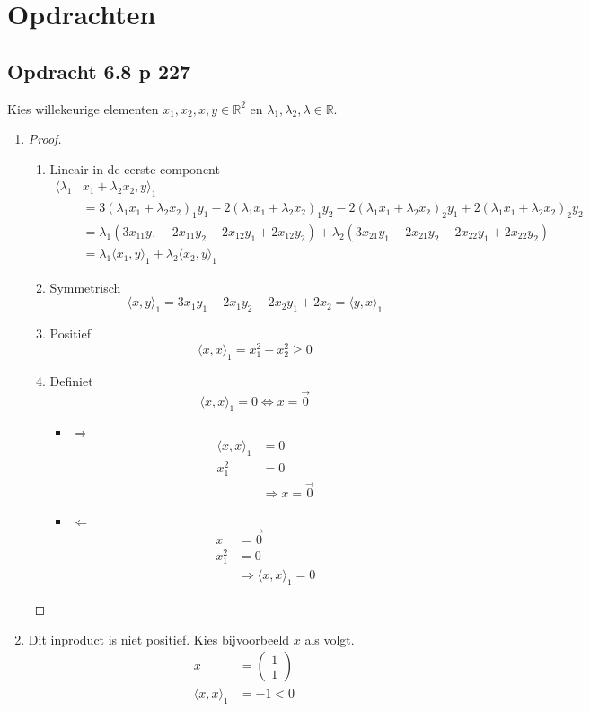 \documentclass[lineaire_algebra_oplossingen.tex]{subfiles}
\begin{document}
\section{Opdrachten}
\subsection{Opdracht 6.8 p 227}
\label{6.8}
Kies willekeurige elementen $x_1,x_2,x,y \in \mathbb{R}^{2}$ en $\lambda_1,\lambda_2,\lambda \in \mathbb{R}$.
\begin{enumerate}
\item
\begin{proof}
\begin{enumerate}
\item Lineair in de eerste component
\begin{align*}
\langle \lambda_1&x_1+ \lambda_2x_2,y \rangle_1 \\
&= 3(\lambda_1x_1 + \lambda_2x_2)_1y_1 - 2(\lambda_1x_1 + \lambda_2x_2)_1y_2-2(\lambda_1x_1 + \lambda_2x_2)_2y_1+2(\lambda_1x_1 + \lambda_2x_2)_2y_2 \\
&= \lambda_1(3x_{11}y_1-2x_{11}y_2-2x_{12}y_1+2x_{12}y_2) + \lambda_2(3x_{21}y_1-2x_{21}y_2-2x_{22}y_1+2x_{22}y_2) \\
&= \lambda_1\langle x_1,y \rangle_1 + \lambda_2\langle x_2,y \rangle_1
\end{align*}

\item Symmetrisch
\[
\langle x , y \rangle_1
=
3x_{1}y_1-2x_{1}y_2-2x_{2}y_1+2x_{2}
= \langle y , x \rangle_1
\]

\item Positief
\[
\langle x,x \rangle_1  = x_1^2 + x_2^2\ge 0
\]

\item Definiet
\[
\langle x,x \rangle_1 = 0 \Leftrightarrow x= \vec{0}
\]
\begin{itemize}
\item $\Rightarrow$
\begin{align*}
\langle x,x \rangle_1 &= 0 \\
x_1^2 &= 0 \\
&\Longrightarrow x = \vec{0}
\end{align*}

\item $\Leftarrow$
\begin{align*}
x &= \vec{0} \\
x_1^2 &= 0 \\
& \Longrightarrow \langle x,x \rangle_1 = 0
\end{align*}
\end{itemize}
\end{enumerate}
\end{proof}

\item
Dit inproduct is niet positief. 
Kies bijvoorbeeld $x$ als volgt.
\begin{align*}
x &= 
\begin{pmatrix}
1\\1
\end{pmatrix} \\
\langle x,x \rangle_1 &= -1 <0
\end{align*}
\end{enumerate}
\end{document}
